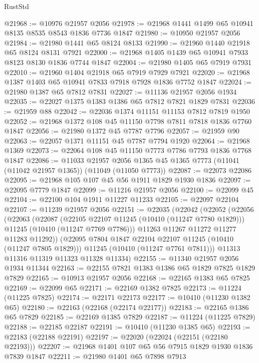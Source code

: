 \begin{lexlean}{RustStd}
\begin{coremodule}
@21968 := @10976 @21957 @2056
@21978 := @21968 @1441 @1499 @65 @10941 @8135 @8535 @8543 @1836 @7736 @1847
@21980 := @10950 @21957 @2056
@21984 := @21980 @1441 @65 @8124 @8133
@21990 := @21960 @1440 @21918 @65 @8124 @8131 @7921
@22000 := @21968 @1405 @1439 @65 @10941 @7933 @8123 @8130 @1836 @7744 @1847
@22004 := @21980 @1405 @65 @7919 @7931
@22010 := @21960 @1404 @21918 @65 @7919 @7929 @7921
@22020 := @21968 @1387 @1403 @65 @10941 @7833 @7918 @7928 @1836 @7752 @1847
@22024 := @21980 @1387 @65 @7812 @7831
@22027 := @11136 @21957 @2056 @1934
@22035 := @22027 @1375 @1383 @1386 @65 @7812 @7821 @1829 @7831
@22036 := @21959 @88
@22042 := @22036 @1374 @11151 @11153 @7812 @7819 @1950
@22052 := @21968 @1372 @108 @45 @11150 @7798 @7811 @7818 @1836 @7760 @1847
@22056 := @21980 @1372 @45 @7787 @7796
@22057 := @21959 @90
@22063 := @22057 @1371 @11151 @45 @7787 @7794 @1920
@22064 := @21968 @1369
@22073 := @22064 @108 @45 @11150 @7773 @7786 @7793 @1836 @7768 @1847
@22086 := @11033
    @21957
    @2056
    @1365
    @45
    @1365
    @7773
    (@11041 (@11042 @21957 @1365))
    (@11049 (@11050 @7773))
@22087 := @22073 @22086
@22095 := @21968 @105 @107 @45 @56 @1911 @1829 @1930 @1836
@22097 := @22095 @7779 @1847
@22099 := @11216 @21957 @2056
@22100 := @22099 @45
@22104 := @22100 @104 @1911 @11227 @11233
@22105 := @22097 @22104
@22107 := @11239 @21957 @2056
@22151 := @22035
    (@22042
      (@22052
        (@22056
          (@22063
            (@22087
              (@22105 @22107 @11245 (@10410 (@11247 @7780 @1829)))
              @11245
              (@10410 (@11247 @7769 @7786)))
            @11263
            @11267
            @11272
            @11277
            @11283
            @11292))
        (@22095 @7804 @1847 @22104 @22107 @11245 (@10410 (@11247 @7805 @1829)))
        @11245
        (@10410 (@11247 @7761 @7811)))
      @11313
      @11316
      @11319
      @11323
      @11328
      @11334)
@22155 := @11340 @21957 @2056 @1934 @11344
@22163 := @22155 @7821 @1383 @1386 @65 @1829 @7825 @1829 @7829
@22165 := @10913 @21957 @2056
@22168 := @22165 @1383 @65 @7825
@22169 := @22099 @65
@22171 := @22169 @1382 @7825
@22173 := @11224 (@11225 @7825)
@22174 := @22171 @22173
@22177 := @10410 (@11230 @1382 @65)
@22180 := @22163 (@22168 (@22174 @22177))
@22183 := @22165 @1386 @65 @7829
@22185 := @22169 @1385 @7829
@22187 := @11224 (@11225 @7829)
@22188 := @22185 @22187
@22191 := @10410 (@11230 @1385 @65)
@22193 := @22183 (@22188 @22191)
@22197 := @22020 (@22024 (@22151 (@22180 @22193)))
@22207 := @21968 @1401 @107 @65 @56 @7915 @1829 @1930 @1836 @7839 @1847
@22211 := @21980 @1401 @65 @7898 @7913

\end{coremodule}
\end{lexlean}
